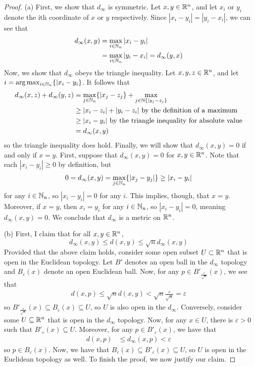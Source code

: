 \documentclass[./main.tex]{subfiles}
\begin{document}
\begin{proof}
    (a) First, we show that $d_\infty$ is symmetric. Let $x,y\in \mathbb{R}^n$, and let $x_i$ or $y_i$ denote the ith coordinate 
    of $x$ or $y$ respectively. Since $|x_i-y_i|=|y_i-x_i|$, we can see that 
    \begin{align*}
    	d_\infty(x,y) &= \max_{i\in\mathbb{N}_n}|x_i-y_i| \\
	    &= \max_{i\in\mathbb{N}_n}|y_i-x_i| = d_\infty(y,x)
	\end{align*}
	Now, we show that $d_\infty$ obeys the triangle inequality. Let $x,y,z\in \mathbb{R}^n$, and let $i=\arg\max_{i\in\mathbb{N}_n}\{|x_i-y_i\}$.
    It follows that
    \begin{align*}
        d_\infty(x,z) + d_\infty(y,z) &= \max_{j\in\mathbb{N}_n}\{|x_j-z_j\} + \max_{j\in\mathbb{N}\{|y_j-z_j\}}\\
        &\geq |x_i-z_i| + |y_i-z_i| \text{ by the definition of a maximum}\\
        &\geq |x_i-y_i| \text{ by the triangle inequality for absolute value}\\
        &= d_\infty(x,y)
    \end{align*}
    so the triangle inequality does hold. Finally, we will show that $d_\infty(x,y)=0$ if and only if $x=y$. First, suppose that
    $d_\infty(x,y)=0$ for $x,y\in \mathbb{R}^n$. Note that each $|x_i-y_i|\geq 0$ by definition, but 
    \[
        0 = d_\infty(x,y)=\max_{j\in\mathbb{N}_n}\{|x_j-y_j|\} \geq |x_i-y_i|
    \]
    for any $i\in\mathbb{N}_n$, so $|x_i-y_i|=0$ for any $i$. This implies, though, that $x=y$. Moreover, if $x=y$, then $x_i=y_i$ for
    any $i\in\mathbb{N}_n$, so $|x_i-y_i| =0$, meaning $d_\infty(x,y)=0$. We conclude that $d_\infty$ is a metric on $\mathbb{R}^n$.

    (b) First, I claim that for all $x,y\in \mathbb{R}^n$, 
    \[
        d_\infty(x,y) \leq d(x,y) \leq \sqrt{n} d_\infty(x,y)
    \]
    Provided that the above claim holds, consider some open subset $U\subset\mathbb{R}^n$ that is open in the Euclidean topology. 
    Let $B'$ denotes an open ball in the $d_\infty$ topology and $B_\varepsilon(x)$ denote an open Euclidean ball. Now,
    for any $p\in B'_{\frac{\varepsilon}{\sqrt{n}}}(x)$, we see that
    \begin{align*}
        d(x,p) \leq \sqrt{n}d(x,y) < \sqrt{n}\frac{\varepsilon}{\sqrt{n}} = \varepsilon
    \end{align*}
    so $B'_{\frac{\varepsilon}{\sqrt{n}}}(x)\subseteq B_\varepsilon(x)\subseteq U$, so $U$ is also open in the $d_\infty$.
    Conversely, consider some $U\subseteq\mathbb{R}^n$ that is open in the $d_\infty$ topology. Now, for any $x\in U$, there is 
    $\varepsilon>0$ such that $B'_{\varepsilon}(x)\subseteq U$. Moreover, for any $p\in B'_{\varepsilon}(x)$, we have that
    \begin{align*}
        d(x,p) &\leq d_\infty(x,p) <\varepsilon
    \end{align*}
    so $p\in B_{\varepsilon}(x)$. Now, we have that $B_\varepsilon(x)\subseteq B'_{\varepsilon}(x)\subseteq U$, so $U$ is open
    in the Euclidean topology as well. To finish the proof, we now justify our claim.
    \medskip


\end{proof}
\end{document}
